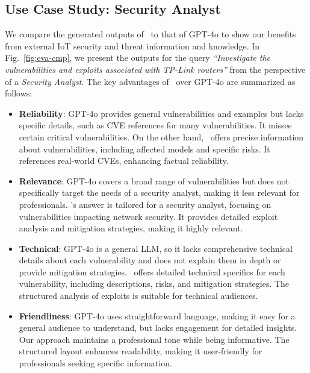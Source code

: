 \subsection{Use Case Study: Security Analyst}\label{appendix:use-case-cmp}

We compare the generated outputs of \chatiot\ to that of GPT-4o to show our benefits from external IoT security and threat information and knowledge.
In Fig.~\ref{fig:eva-cmp}, we present the outputs for the query \textit{“Investigate the vulnerabilities and exploits associated with TP-Link routers”} from the perspective of a \textit{Security Analyst}. The key advantages of \chatiot\ over GPT-4o are summarized as follows:

\begin{itemize}
    \item \textbf{Reliability}: GPT-4o provides general vulnerabilities and examples but lacks specific details, such as CVE references for many vulnerabilities. It misses certain critical vulnerabilities. On the other hand, \chatiot\ offers precise information about vulnerabilities, including affected models and specific risks. It references real-world CVEs, enhancing factual reliability.
    
    \item \textbf{Relevance}: GPT-4o covers a broad range of vulnerabilities but does not specifically target the needs of a security analyst, making it less relevant for professionals. 
    \chatiot's answer is tailored for a security analyst, focusing on vulnerabilities impacting network security. It provides detailed exploit analysis and mitigation strategies, making it highly relevant.

    \item \textbf{Technical}: GPT-4o is a general LLM, so it lacks comprehensive technical details about each vulnerability and does not explain them in depth or provide mitigation strategies.
    \chatiot\ offers detailed technical specifics for each vulnerability, including descriptions, risks, and mitigation strategies. The structured analysis of exploits is suitable for technical audiences.

    \item \textbf{Friendliness}: GPT-4o uses straightforward language, making it easy for a general audience to understand, but lacks engagement for detailed insights.
    Our approach maintains a professional tone while being informative. The structured layout enhances readability, making it user-friendly for professionals seeking specific information.
\end{itemize}

